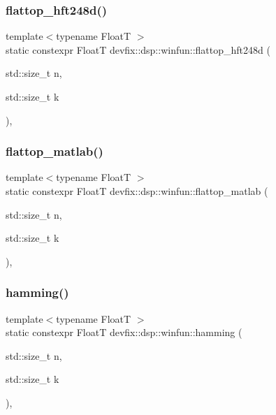 \subsubsection{\texorpdfstring{flattop\+\_\+hft248d()}{flattop\_hft248d()}}
{\footnotesize\ttfamily template$<$typename FloatT $>$ \\
static constexpr FloatT devfix\+::dsp\+::winfun\+::flattop\+\_\+hft248d (\begin{DoxyParamCaption}\item[{std\+::size\+\_\+t}]{n,  }\item[{std\+::size\+\_\+t}]{k }\end{DoxyParamCaption})\hspace{0.3cm}{\ttfamily [inline]}, {\ttfamily [static]}}

\mbox{\label{structdevfix_1_1dsp_1_1winfun_ade67435e6edbb6f742ba734069d21b77}} 
\subsubsection{\texorpdfstring{flattop\+\_\+matlab()}{flattop\_matlab()}}
{\footnotesize\ttfamily template$<$typename FloatT $>$ \\
static constexpr FloatT devfix\+::dsp\+::winfun\+::flattop\+\_\+matlab (\begin{DoxyParamCaption}\item[{std\+::size\+\_\+t}]{n,  }\item[{std\+::size\+\_\+t}]{k }\end{DoxyParamCaption})\hspace{0.3cm}{\ttfamily [inline]}, {\ttfamily [static]}}

\mbox{\label{structdevfix_1_1dsp_1_1winfun_a9ae2b4ce20ad3750feebdf33ffbbdcba}} 
\subsubsection{\texorpdfstring{hamming()}{hamming()}}
{\footnotesize\ttfamily template$<$typename FloatT $>$ \\
static constexpr FloatT devfix\+::dsp\+::winfun\+::hamming (\begin{DoxyParamCaption}\item[{std\+::size\+\_\+t}]{n,  }\item[{std\+::size\+\_\+t}]{k }\end{DoxyParamCaption})\hspace{0.3cm}{\ttfamily [inline]}, {\ttfamily [static]}}

